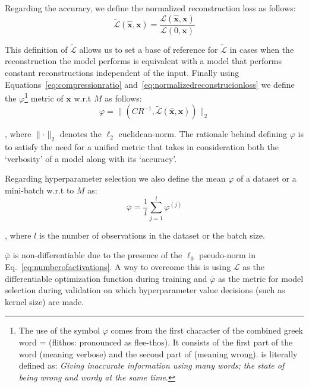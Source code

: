 \documentclass[journal]{IEEEtran}
\begin{document}
Regarding the accuracy, we define the normalized reconstruction loss as follows:
\begin{equation}
	\label{eq:normalizedreconstrucionloss}
	\tilde{\mathcal{L}}(\hat{\bm{x}},\bm{x}) = \frac{\mathcal{L}(\hat{\bm{x}},\bm{x})}{\mathcal{L}(0,\bm{x})}
\end{equation}

This definition of $\tilde{\mathcal{L}}$ allows us to set a base of reference for $\tilde{\mathcal{L}}$ in cases when the reconstruction the model performs is equivalent with a model that performs constant reconstructions independent of the input.
Finally using Equations~\ref{eq:compressionratio} and~\ref{eq:normalizedreconstrucionloss} we define the $\varphi$\footnote{The use of the symbol $\varphi$ comes from the first character of the combined greek word {} = {} (flithos: pronounced as flee-thos). It consists of the first part of the word {} (meaning verbose) and the second part of {} (meaning wrong). {} is literally defined as: \textit{Giving inaccurate information using many words; the state of being wrong and wordy at the same time}.} metric of $\bm{x}$ w.r.t $M$ as follows:
\begin{equation}
	\label{eq:flithos}
	\varphi=\lVert(CR^{-1},\tilde{\mathcal{L}}(\hat{\bm{x}},\bm{x}))\rVert_2
\end{equation}

\noindent
, where $\lVert \cdot \rVert_2$ denotes the $\ell_2$ euclidean-norm.
The rationale behind defining $\varphi$ is to satisfy the need for a unified metric that takes in consideration both the `verbosity' of a model along with its `accuracy'.

Regarding hyperparameter selection we also define the mean $\varphi$ of a dataset or a mini-batch w.r.t to $M$ as:
\begin{equation}
	\label{eq:meanflithos}
	\bar\varphi = \frac{1}{l}\sum\limits_{j=1}^l \varphi^{(j)}
\end{equation}

\noindent
, where $l$ is the number of observations in the dataset or the batch size.

$\bar\varphi$ is non-differentiable due to the presence of the $\ell_0$ pseudo-norm in Eq.~\ref{eq:numberofactivations}.
A way to overcome this is using $\mathcal{L}$ as the differentiable optimization function during training and $\bar\varphi$ as the metric for model selection during validation on which hyperparameter value decisions (such as kernel size) are made.
\end{document}
